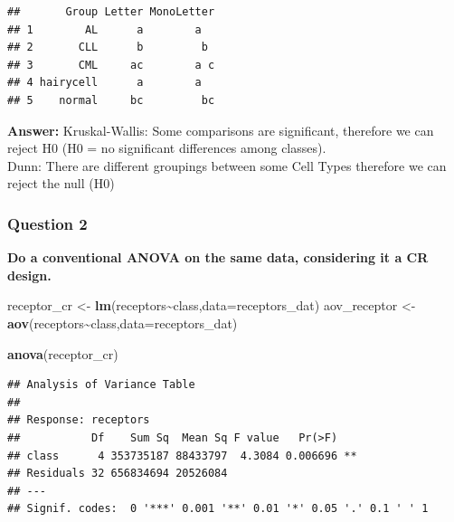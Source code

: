 \documentclass[
]{article}
\newenvironment{Shaded}{\begin{snugshade}}{\end{snugshade}}
\newcommand{\AttributeTok}[1]{\textcolor[rgb]{0.13,0.29,0.53}{#1}}
\newcommand{\FloatTok}[1]{\textcolor[rgb]{0.00,0.00,0.81}{#1}}
\newcommand{\FunctionTok}[1]{\textcolor[rgb]{0.13,0.29,0.53}{\textbf{#1}}}
\newcommand{\NormalTok}[1]{#1}
\newcommand{\OtherTok}[1]{\textcolor[rgb]{0.56,0.35,0.01}{#1}}
\newcommand{\SpecialCharTok}[1]{\textcolor[rgb]{0.81,0.36,0.00}{\textbf{#1}}}
\begin{document}
\begin{Shaded}
\end{Shaded}

\begin{verbatim}
##       Group Letter MonoLetter
## 1        AL      a        a  
## 2       CLL      b         b 
## 3       CML     ac        a c
## 4 hairycell      a        a  
## 5    normal     bc         bc
\end{verbatim}

\textbf{Answer:} Kruskal-Wallis: Some comparisons are significant,
therefore we can reject H0 (H0 = no significant differences among
classes).\\
Dunn: There are different groupings between some Cell Types therefore we
can reject the null (H0)

\subsubsection{Question 2}\label{question-2}

\textbf{Do a conventional ANOVA on the same data, considering it a CR
design.}

\begin{Shaded}
\begin{Highlighting}[]
\NormalTok{receptor\_cr }\OtherTok{\textless{}{-}} \FunctionTok{lm}\NormalTok{(receptors}\SpecialCharTok{\textasciitilde{}}\NormalTok{class,}\AttributeTok{data=}\NormalTok{receptors\_dat)}
\NormalTok{aov\_receptor }\OtherTok{\textless{}{-}} \FunctionTok{aov}\NormalTok{(receptors}\SpecialCharTok{\textasciitilde{}}\NormalTok{class,}\AttributeTok{data=}\NormalTok{receptors\_dat)}

\FunctionTok{anova}\NormalTok{(receptor\_cr)}
\end{Highlighting}
\end{Shaded}

\begin{verbatim}
## Analysis of Variance Table
## 
## Response: receptors
##           Df    Sum Sq  Mean Sq F value   Pr(>F)   
## class      4 353735187 88433797  4.3084 0.006696 **
## Residuals 32 656834694 20526084                    
## ---
## Signif. codes:  0 '***' 0.001 '**' 0.01 '*' 0.05 '.' 0.1 ' ' 1
\end{verbatim}
\end{document}
